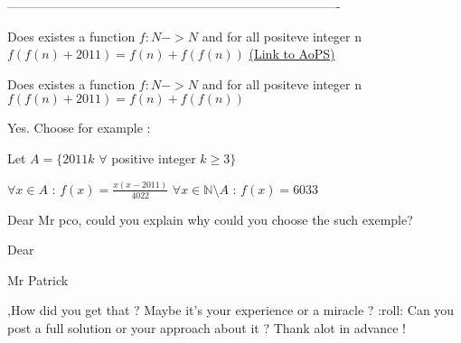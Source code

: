 -------------------------------------------------------------------------------

\begin{problem}
	Does existes a function $f:N->N$ and for all positeve integer n
$f(f(n)+2011)=f(n)+f(f(n))$
	\flushright \href{https://artofproblemsolving.com/community/c6h439124}{(Link to AoPS)}
\end{problem}



\begin{solution}
	\begin{tcolorbox}Does existes a function $f:N->N$ and for all positeve integer n
$f(f(n)+2011)=f(n)+f(f(n))$\end{tcolorbox}
Yes. Choose for example :

Let $A=\{2011k$  $\forall$ positive integer $k\ge 3\}$

$\forall x\in A$ : $f(x)=\frac {x(x-2011)}{4022}$
$\forall x\in\mathbb N\setminus A$ : $f(x)=6033$
\end{solution}



\begin{solution}
	Dear Mr pco, could you explain why could you choose the such exemple?
\end{solution}



\begin{solution}
	Dear \begin{bolded}Mr Patrick\end{bolded},How did you get that ? Maybe it's your experience or a miracle  ? :roll: 
Can you post a full solution or your approach about it ?
Thank alot in advance !
\end{solution}



